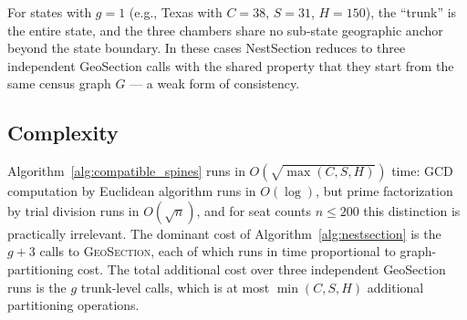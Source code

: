 For states with $g = 1$ (e.g., Texas with $C=38$, $S=31$, $H=150$), the
``trunk'' is the entire state, and the three chambers share no sub-state
geographic anchor beyond the state boundary.  In these cases NestSection
reduces to three independent GeoSection calls with the shared property that
they start from the same census graph $G$ --- a weak form of consistency.

\subsection{Complexity}

Algorithm~\ref{alg:compatible_spines} runs in $O(\sqrt{\max(C,S,H)})$ time:
GCD computation by Euclidean algorithm runs in $O(\log)$, but prime
factorization by trial division runs in $O(\sqrt{n})$, and for seat counts
$n \leq 200$ this distinction is practically irrelevant.
The dominant cost of
Algorithm~\ref{alg:nestsection} is the $g+3$ calls to \textsc{GeoSection},
each of which runs in time proportional to graph-partitioning cost.  The
total additional cost over three independent GeoSection runs is the $g$
trunk-level calls, which is at most $\min(C,S,H)$ additional partitioning
operations.
